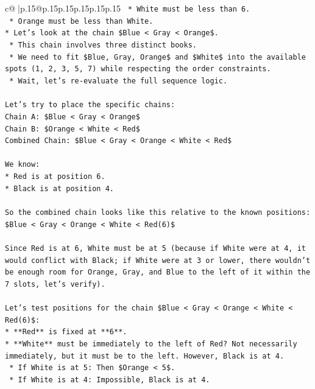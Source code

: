 \documentclass{article}
\begin{document}
{\begin{supertabular}{c@{$\;$}|p{.15\linewidth}@{}p{.15\linewidth}p{.15\linewidth}p{.15\linewidth}p{.15\linewidth}p{.15\linewidth}}
{{{\texttt{    *   White must be less than 6.} \\
\texttt{    *   Orange must be less than White.} \\
\texttt{*   Let's look at the chain \$Blue < Gray < Orange\$.} \\
\texttt{    *   This chain involves three distinct books.} \\
\texttt{    *   We need to fit \$Blue, Gray, Orange\$ and \$White\$ into the available spots (1, 2, 3, 5, 7) while respecting the order constraints.} \\
\texttt{    *   Wait, let's re{-}evaluate the full sequence logic.} \\
\\ 
\texttt{Let's try to place the specific chains:} \\
\texttt{Chain A: \$Blue < Gray < Orange\$} \\
\texttt{Chain B: \$Orange < White < Red\$} \\
\texttt{Combined Chain: \$Blue < Gray < Orange < White < Red\$} \\
\\ 
\texttt{We know:} \\
\texttt{*   Red is at position 6.} \\
\texttt{*   Black is at position 4.} \\
\\ 
\texttt{So the combined chain looks like this relative to the known positions:} \\
\texttt{\$Blue < Gray < Orange < White < Red(6)\$} \\
\\ 
\texttt{Since Red is at 6, White must be at 5 (because if White were at 4, it would conflict with Black; if White were at 3 or lower, there wouldn't be enough room for Orange, Gray, and Blue to the left of it within the 7 slots, let's verify).} \\
\\ 
\texttt{Let's test positions for the chain \$Blue < Gray < Orange < White < Red(6)\$:} \\
\texttt{*   **Red** is fixed at **6**.} \\
\texttt{*   **White** must be immediately to the left of Red? Not necessarily immediately, but it must be to the left. However, Black is at 4.} \\
\texttt{    *   If White is at 5: Then \$Orange < 5\$.} \\
\texttt{    *   If White is at 4: Impossible, Black is at 4.} \\
}}}
\end{supertabular}}
\end{document}
